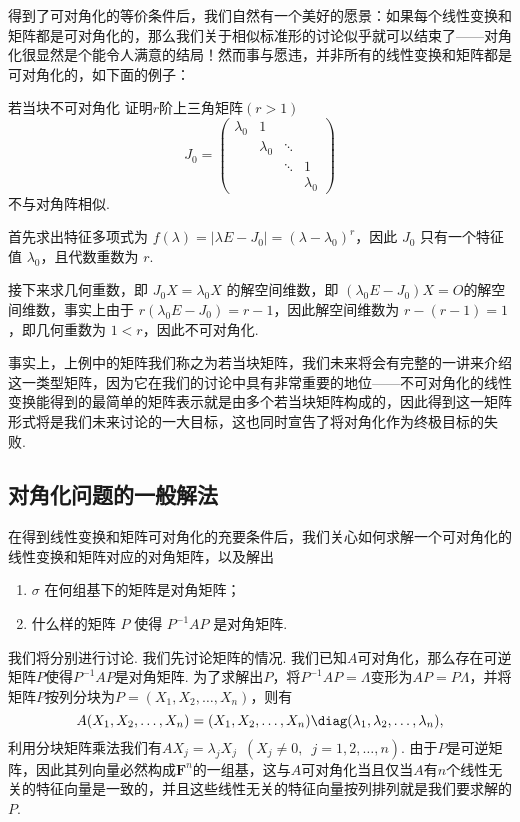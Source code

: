 得到了可对角化的等价条件后，我们自然有一个美好的愿景：如果每个线性变换和矩阵都是可对角化的，那么我们关于相似标准形的讨论似乎就可以结束了——对角化很显然是个能令人满意的结局！然而事与愿违，并非所有的线性变换和矩阵都是可对角化的，如下面的例子：
\begin{example}{}{若当块不可对角化}
    证明$r$阶上三角矩阵$(r>1)$
    \[J_0=\begin{pmatrix}
            \lambda_0 & 1         &        &           \\
                      & \lambda_0 & \ddots &           \\
                      &           & \ddots & 1         \\
                      &           &        & \lambda_0
        \end{pmatrix}\]
    不与对角阵相似.
\end{example}

\begin{solution}
    首先求出特征多项式为 $f(\lambda) = |\lambda E - J_0| = (\lambda - \lambda_0)^r$，因此 $J_0$ 只有一个特征值 $\lambda_0$，且代数重数为 $r$.

    接下来求几何重数，即 $J_0X = \lambda_0X$ 的解空间维数，即 $(\lambda_0 E - J_0)X = O$的解空间维数，事实上由于 $r(\lambda_0 E - J_0) = r - 1$，因此解空间维数为 $r - (r - 1) = 1$，即几何重数为 $1 < r$，因此不可对角化.
\end{solution}

事实上，上例中的矩阵我们称之为若当块矩阵，我们未来将会有完整的一讲来介绍这一类型矩阵，因为它在我们的讨论中具有非常重要的地位——不可对角化的线性变换能得到的最简单的矩阵表示就是由多个若当块矩阵构成的，因此得到这一矩阵形式将是我们未来讨论的一大目标，这也同时宣告了将对角化作为终极目标的失败.

\subsection{对角化问题的一般解法}

在得到线性变换和矩阵可对角化的充要条件后，我们关心如何求解一个可对角化的线性变换和矩阵对应的对角矩阵，以及解出
\begin{enumerate}
    \item $\sigma$ 在何组基下的矩阵是对角矩阵；

    \item 什么样的矩阵 $P$ 使得 $P^{-1}AP$ 是对角矩阵.
\end{enumerate}

我们将分别进行讨论. 我们先讨论矩阵的情况. 我们已知$A$可对角化，那么存在可逆矩阵$P$使得$P^{-1}AP$是对角矩阵. 为了求解出$P$，将$P^{-1}AP=\varLambda$变形为$AP=P\varLambda$，并将矩阵$P$按列分块为$P=(X_1,X_2,\ldots,X_n)$，则有
\[A(X_1,X_2,\ldots,X_n)=(X_1,X_2,\ldots,X_n)\diag(\lambda_1,\lambda_2,\ldots,\lambda_n),\]
利用分块矩阵乘法我们有$AX_j=\lambda_jX_j\enspace(X_j\neq 0,\enspace j=1,2,\ldots,n)$. 由于$P$是可逆矩阵，因此其列向量必然构成$\mathbf{F}^n$的一组基，这与$A$可对角化当且仅当$A$有$n$个线性无关的特征向量是一致的，并且这些线性无关的特征向量按列排列就是我们要求解的$P$.

